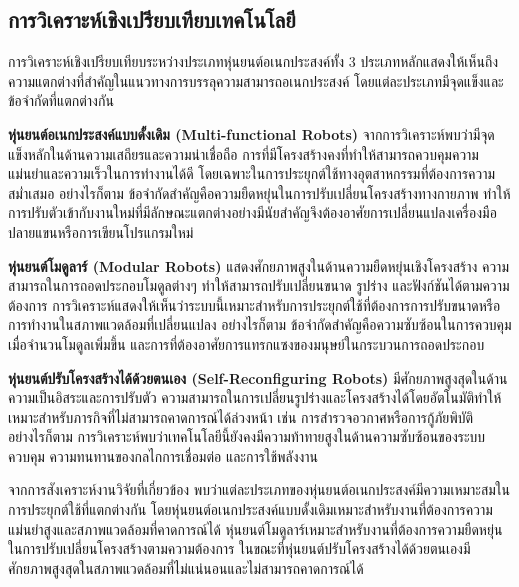 \documentclass[a4paper]{article}
\begin{document}
\subsection{การวิเคราะห์เชิงเปรียบเทียบเทคโนโลยี}

การวิเคราะห์เชิงเปรียบเทียบระหว่างประเภทหุ่นยนต์อเนกประสงค์ทั้ง 3 ประเภทหลักแสดงให้เห็นถึงความแตกต่างที่สำคัญในแนวทางการบรรลุความสามารถอเนกประสงค์ โดยแต่ละประเภทมีจุดแข็งและข้อจำกัดที่แตกต่างกัน

\textbf{หุ่นยนต์อเนกประสงค์แบบดั้งเดิม (Multi-functional Robots)} จากการวิเคราะห์พบว่ามีจุดแข็งหลักในด้านความเสถียรและความน่าเชื่อถือ \parencite{mohammadi2023mobile} การที่มีโครงสร้างคงที่ทำให้สามารถควบคุมความแม่นยำและความเร็วในการทำงานได้ดี โดยเฉพาะในการประยุกต์ใช้ทางอุตสาหกรรมที่ต้องการความสม่ำเสมอ \parencite{li2025finite} อย่างไรก็ตาม ข้อจำกัดสำคัญคือความยืดหยุ่นในการปรับเปลี่ยนโครงสร้างทางกายภาพ ทำให้การปรับตัวเข้ากับงานใหม่ที่มีลักษณะแตกต่างอย่างมีนัยสำคัญจึงต้องอาศัยการเปลี่ยนแปลงเครื่องมือปลายแขนหรือการเขียนโปรแกรมใหม่

\textbf{หุ่นยนต์โมดูลาร์ (Modular Robots)} แสดงศักยภาพสูงในด้านความยืดหยุ่นเชิงโครงสร้าง \parencite{post2023modular} ความสามารถในการถอดประกอบโมดูลต่างๆ ทำให้สามารถปรับเปลี่ยนขนาด รูปร่าง และฟังก์ชันได้ตามความต้องการ \parencite{liang2025decoding} การวิเคราะห์แสดงให้เห็นว่าระบบนี้เหมาะสำหรับการประยุกต์ใช้ที่ต้องการการปรับขนาดหรือการทำงานในสภาพแวดล้อมที่เปลี่ยนแปลง \parencite{seo2019modular} อย่างไรก็ตาม ข้อจำกัดสำคัญคือความซับซ้อนในการควบคุมเมื่อจำนวนโมดูลเพิ่มขึ้น และการที่ต้องอาศัยการแทรกแซงของมนุษย์ในกระบวนการถอดประกอบ \parencite{bi2016survey}

\textbf{หุ่นยนต์ปรับโครงสร้างได้ด้วยตนเอง (Self-Reconfiguring Robots)} มีศักยภาพสูงสุดในด้านความเป็นอิสระและการปรับตัว \parencite{hameed2017modular} ความสามารถในการเปลี่ยนรูปร่างและโครงสร้างได้โดยอัตโนมัติทำให้เหมาะสำหรับภารกิจที่ไม่สามารถคาดการณ์ได้ล่วงหน้า เช่น การสำรวจอวกาศหรือการกู้ภัยพิบัติ \parencite{yim2000modular} อย่างไรก็ตาม การวิเคราะห์พบว่าเทคโนโลยีนี้ยังคงมีความท้าทายสูงในด้านความซับซ้อนของระบบควบคุม ความทนทานของกลไกการเชื่อมต่อ และการใช้พลังงาน \parencite{fukuda1991dynamically}

จากการสังเคราะห์งานวิจัยที่เกี่ยวข้อง พบว่าแต่ละประเภทของหุ่นยนต์อเนกประสงค์มีความเหมาะสมในการประยุกต์ใช้ที่แตกต่างกัน โดยหุ่นยนต์อเนกประสงค์แบบดั้งเดิมเหมาะสำหรับงานที่ต้องการความแม่นยำสูงและสภาพแวดล้อมที่คาดการณ์ได้ \parencite{krishnan2023deep} หุ่นยนต์โมดูลาร์เหมาะสำหรับงานที่ต้องการความยืดหยุ่นในการปรับเปลี่ยนโครงสร้างตามความต้องการ ในขณะที่หุ่นยนต์ปรับโครงสร้างได้ด้วยตนเองมีศักยภาพสูงสุดในสภาพแวดล้อมที่ไม่แน่นอนและไม่สามารถคาดการณ์ได้
\end{document}
